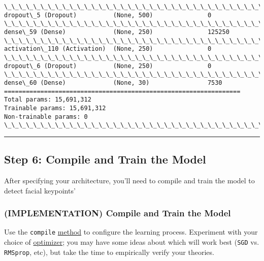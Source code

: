 \documentclass[11pt]{article}
\begin{document}
\begin{Verbatim}[commandchars=\\\{\}]
\_\_\_\_\_\_\_\_\_\_\_\_\_\_\_\_\_\_\_\_\_\_\_\_\_\_\_\_\_\_\_\_\_\_\_\_\_\_\_\_\_\_\_\_\_\_\_\_\_\_\_\_\_\_\_\_\_\_\_\_\_\_\_\_\_
dropout\_5 (Dropout)          (None, 500)               0         
\_\_\_\_\_\_\_\_\_\_\_\_\_\_\_\_\_\_\_\_\_\_\_\_\_\_\_\_\_\_\_\_\_\_\_\_\_\_\_\_\_\_\_\_\_\_\_\_\_\_\_\_\_\_\_\_\_\_\_\_\_\_\_\_\_
dense\_59 (Dense)             (None, 250)               125250    
\_\_\_\_\_\_\_\_\_\_\_\_\_\_\_\_\_\_\_\_\_\_\_\_\_\_\_\_\_\_\_\_\_\_\_\_\_\_\_\_\_\_\_\_\_\_\_\_\_\_\_\_\_\_\_\_\_\_\_\_\_\_\_\_\_
activation\_110 (Activation)  (None, 250)               0         
\_\_\_\_\_\_\_\_\_\_\_\_\_\_\_\_\_\_\_\_\_\_\_\_\_\_\_\_\_\_\_\_\_\_\_\_\_\_\_\_\_\_\_\_\_\_\_\_\_\_\_\_\_\_\_\_\_\_\_\_\_\_\_\_\_
dropout\_6 (Dropout)          (None, 250)               0         
\_\_\_\_\_\_\_\_\_\_\_\_\_\_\_\_\_\_\_\_\_\_\_\_\_\_\_\_\_\_\_\_\_\_\_\_\_\_\_\_\_\_\_\_\_\_\_\_\_\_\_\_\_\_\_\_\_\_\_\_\_\_\_\_\_
dense\_60 (Dense)             (None, 30)                7530      
=================================================================
Total params: 15,691,312
Trainable params: 15,691,312
Non-trainable params: 0
\_\_\_\_\_\_\_\_\_\_\_\_\_\_\_\_\_\_\_\_\_\_\_\_\_\_\_\_\_\_\_\_\_\_\_\_\_\_\_\_\_\_\_\_\_\_\_\_\_\_\_\_\_\_\_\_\_\_\_\_\_\_\_\_\_

    \end{Verbatim}

    \begin{center}\rule{0.5\linewidth}{\linethickness}\end{center}

\subsection{Step 6: Compile and Train the
Model}\label{step-6-compile-and-train-the-model}

After specifying your architecture, you'll need to compile and train the
model to detect facial keypoints'

    \subsubsection{(IMPLEMENTATION) Compile and Train the
Model}\label{implementation-compile-and-train-the-model}

Use the \texttt{compile}
\href{https://keras.io/models/sequential/\#sequential-model-methods}{method}
to configure the learning process. Experiment with your choice of
\href{https://keras.io/optimizers/}{optimizer}; you may have some ideas
about which will work best (\texttt{SGD} vs. \texttt{RMSprop}, etc), but
take the time to empirically verify your theories.
\end{document}
